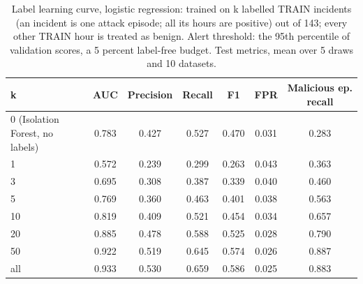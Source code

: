 \begin{table}[t]
\centering
\scriptsize
\caption{Label learning curve, logistic regression: trained on k labelled TRAIN incidents (an incident is one attack episode; all its hours are positive) out of 143; every other TRAIN hour is treated as benign. Alert threshold: the 95th percentile of validation scores, a 5 percent label-free budget. Test metrics, mean over 5 draws and 10 datasets.}
\label{tab:lc-logistic-b5}
\begin{tabular}{lcccccc}
\hline
k & AUC & Precision & Recall & F1 & FPR & Malicious ep. recall \\
\hline
0 (Isolation Forest, no labels) & 0.783 & 0.427 & 0.527 & 0.470 & 0.031 & 0.283 \\
1 & 0.572 & 0.239 & 0.299 & 0.263 & 0.043 & 0.363 \\
3 & 0.695 & 0.308 & 0.387 & 0.339 & 0.040 & 0.460 \\
5 & 0.769 & 0.360 & 0.463 & 0.401 & 0.038 & 0.563 \\
10 & 0.819 & 0.409 & 0.521 & 0.454 & 0.034 & 0.657 \\
20 & 0.885 & 0.478 & 0.588 & 0.525 & 0.028 & 0.790 \\
50 & 0.922 & 0.519 & 0.645 & 0.574 & 0.026 & 0.887 \\
all & 0.933 & 0.530 & 0.659 & 0.586 & 0.025 & 0.883 \\
\hline
\end{tabular}
\end{table}
